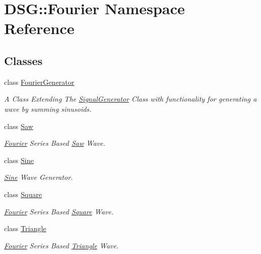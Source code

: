 \hypertarget{namespaceDSG_1_1Fourier}{\section{D\-S\-G\-:\-:Fourier Namespace Reference}
\label{namespaceDSG_1_1Fourier}
}
\subsection*{Classes}
\begin{DoxyCompactItemize}
\item 
class \hyperlink{classDSG_1_1Fourier_1_1FourierGenerator}{Fourier\-Generator}
\begin{DoxyCompactList}\small\item\em A Class Extending The \hyperlink{classDSG_1_1SignalGenerator}{Signal\-Generator} Class with functionality for generating a wave by summing sinusoids. \end{DoxyCompactList}\item 
class \hyperlink{classDSG_1_1Fourier_1_1Saw}{Saw}
\begin{DoxyCompactList}\small\item\em \hyperlink{namespaceDSG_1_1Fourier}{Fourier} Series Based \hyperlink{classDSG_1_1Fourier_1_1Saw}{Saw} Wave. \end{DoxyCompactList}\item 
class \hyperlink{classDSG_1_1Fourier_1_1Sine}{Sine}
\begin{DoxyCompactList}\small\item\em \hyperlink{classDSG_1_1Fourier_1_1Sine}{Sine} Wave Generator. \end{DoxyCompactList}\item 
class \hyperlink{classDSG_1_1Fourier_1_1Square}{Square}
\begin{DoxyCompactList}\small\item\em \hyperlink{namespaceDSG_1_1Fourier}{Fourier} Series Based \hyperlink{classDSG_1_1Fourier_1_1Square}{Square} Wave. \end{DoxyCompactList}\item 
class \hyperlink{classDSG_1_1Fourier_1_1Triangle}{Triangle}
\begin{DoxyCompactList}\small\item\em \hyperlink{namespaceDSG_1_1Fourier}{Fourier} Series Based \hyperlink{classDSG_1_1Fourier_1_1Triangle}{Triangle} Wave. \end{DoxyCompactList}\end{DoxyCompactItemize}
